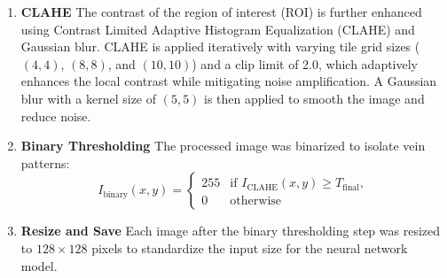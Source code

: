 \begin{enumerate}
    \item \textbf{CLAHE}
    The contrast of the region of interest (ROI) is further enhanced using Contrast Limited Adaptive Histogram Equalization (CLAHE) and Gaussian blur. CLAHE is applied iteratively with varying tile grid sizes (\((4, 4)\), \((8, 8)\), and \((10, 10)\)) and a clip limit of 2.0, which adaptively enhances the local contrast while mitigating noise amplification. A Gaussian blur with a kernel size of \((5, 5)\) is then applied to smooth the image and reduce noise.

    \item \textbf{Binary Thresholding}
    The processed image was binarized to isolate vein patterns:
    \[
    I_{\text{binary}}(x, y) =
    \begin{cases}
    255 & \text{if } I_{\text{CLAHE}}(x, y) \geq T_{\text{final}}, \\
    0 & \text{otherwise}
    \end{cases}
    \]

    \item \textbf{Resize and Save} 
    Each image after the binary thresholding step was resized to \( 128 \times 128 \) pixels to standardize the input size for the neural network model.


\end{enumerate}
